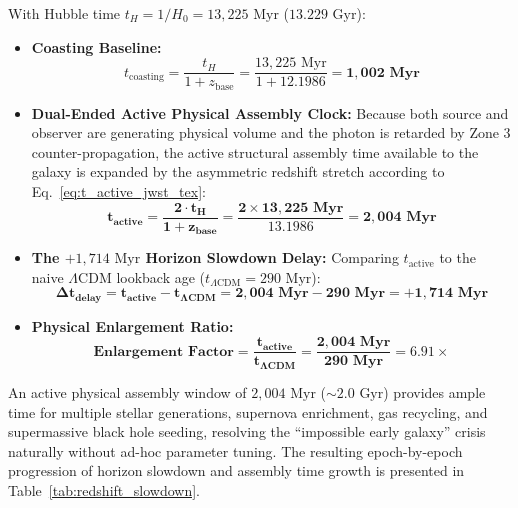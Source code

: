 \documentclass[11pt,a4paper]{article}
\begin{document}
With Hubble time $t_H = 1/H_0 = 13,225\text{ Myr}$ ($13.229\text{ Gyr}$):
\begin{itemize}
    \item \textbf{Coasting Baseline:}
    \begin{equation}
    t_{\text{coasting}} = \frac{t_H}{1 + z_{\text{base}}} = \frac{13,225\text{ Myr}}{1 + 12.1986} = \mathbf{1,002\text{ Myr}}
    \end{equation}
    \item \textbf{Dual-Ended Active Physical Assembly Clock:} Because both source and observer are generating physical volume and the photon is retarded by Zone 3 counter-propagation, the active structural assembly time available to the galaxy is expanded by the asymmetric redshift stretch according to Eq.~\eqref{eq:t_active_jwst_tex}:
    \begin{equation}
    \mathbf{t_{\text{active}} = \frac{2 \cdot t_H}{1 + z_{\text{base}}} = \frac{2 \times 13,225\text{ Myr}}{13.1986} = \mathbf{2,004\text{ Myr}}}
    \label{eq:t_active_jwst_tex}
    \end{equation}
    \item \textbf{The $+1,714\text{ Myr}$ Horizon Slowdown Delay:} Comparing $t_{\text{active}}$ to the naive $\Lambda\text{CDM}$ lookback age ($t_{\Lambda\text{CDM}} = 290\text{ Myr}$):
    \begin{equation}
    \mathbf{\Delta t_{\text{delay}} = t_{\text{active}} - t_{\Lambda\text{CDM}} = 2,004\text{ Myr} - 290\text{ Myr} = \mathbf{+1,714\text{ Myr}}}
    \end{equation}
    \item \textbf{Physical Enlargement Ratio:}
    \begin{equation}
    \mathbf{\text{Enlargement Factor} = \frac{t_{\text{active}}}{t_{\Lambda\text{CDM}}} = \frac{2,004\text{ Myr}}{290\text{ Myr}} = \mathbf{6.91\times}}
    \end{equation}
\end{itemize}

An active physical assembly window of $2,004\text{ Myr}$ ($\sim 2.0\text{ Gyr}$) provides ample time for multiple stellar generations, supernova enrichment, gas recycling, and supermassive black hole seeding, resolving the ``impossible early galaxy'' crisis naturally without ad-hoc parameter tuning. The resulting epoch-by-epoch progression of horizon slowdown and assembly time growth is presented in Table~\ref{tab:redshift_slowdown}.
\end{document}
